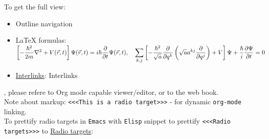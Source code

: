 \documentclass[a4paper,14pt,oneside]{book}
\begin{document}
To get the full view:\\
\begin{itemize}
\item Outline navigation\\
\item \LaTeX{} formulas: \({\displaystyle\left[{-\frac{\hbar^{2}}{2m}}\nabla^{2}+V(\vec{r},t)\right]\Psi({\vec{r}},t)=i\hbar{\partial\over\partial{t}}\Psi({\vec{r}},t),\quad\sum_{k,j}\left[-{\frac{\hbar^{2}}{\sqrt{a}}}{\frac{\partial}{\partial{q^{k}}}}\left({\sqrt{a}}a^{kj}{\frac{\partial}{\partial{q^{j}}}}\right)+V\right]\Psi+{\frac{\hbar}{i}}{\frac{\partial{\Psi}}{\partial{t}}}=0}\)\\
\item \hyperref[orgb333058]{Interlinks}: \label{orgb333058}Interlinks\\
\end{itemize}

, please refere to Org mode capable viewer/editor, or to the web book.\\

Note about markup: \texttt{<<<This is a radio target>>>} - for dynamic \texttt{org-mode} linking.\\

To prettify radio targets in \texttt{Emacs} with \texttt{Elisp} snippet to prettify \texttt{<<<Radio targets>>>} to \uline{Radio targets}:\\
\end{document}
